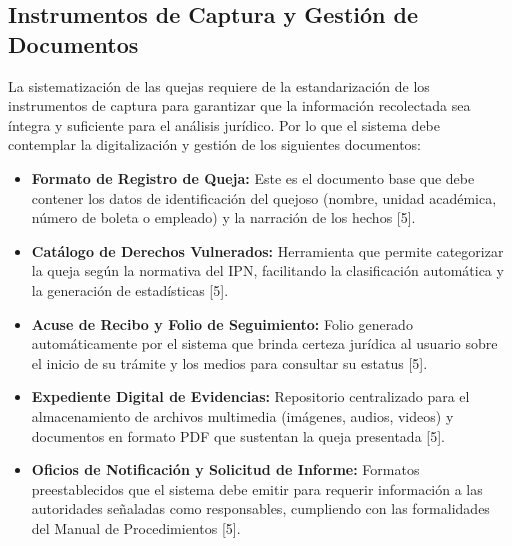 \subsection{Instrumentos de Captura y Gestión de Documentos}
La sistematización de las quejas requiere de la estandarización de los instrumentos de captura para garantizar que la información recolectada sea íntegra y suficiente para el análisis jurídico. Por lo que el sistema debe contemplar la digitalización y gestión de los siguientes documentos:
\begin{itemize}
    \item \textbf{Formato de Registro de Queja:} Este es el documento base que debe contener los datos de identificación del quejoso (nombre, unidad académica, número de boleta o empleado) y la narración de los hechos [5].
    \item \textbf{Catálogo de Derechos Vulnerados:} Herramienta que permite categorizar la queja según la normativa del IPN, facilitando la clasificación automática y la generación de estadísticas [5].
    \item \textbf{Acuse de Recibo y Folio de Seguimiento:} Folio generado automáticamente por el sistema que brinda certeza jurídica al usuario sobre el inicio de su trámite y los medios para consultar su estatus [5].
    \item \textbf{Expediente Digital de Evidencias:} Repositorio centralizado para el almacenamiento de archivos multimedia (imágenes, audios, videos) y documentos en formato PDF que sustentan la queja presentada [5].
    \item \textbf{Oficios de Notificación y Solicitud de Informe:} Formatos preestablecidos que el sistema debe emitir para requerir información a las autoridades señaladas como responsables, cumpliendo con las formalidades del Manual de Procedimientos [5].
\end{itemize}
